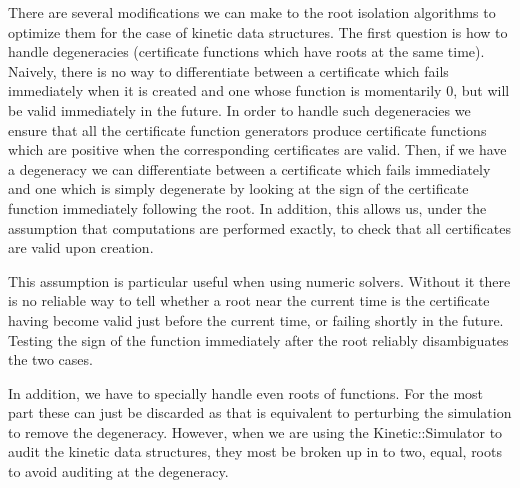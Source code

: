 There are several modifications we can make to the root isolation
algorithms to optimize them for the case of kinetic data structures.
The first question is how to handle degeneracies (certificate
functions which have roots at the same time).  Naively, there is no
way to differentiate between a certificate which fails immediately
when it is created and one whose function is momentarily 0, but will
be valid immediately in the future. In order to handle such
degeneracies we ensure that all the certificate function generators
produce certificate functions which are positive when the
corresponding certificates are valid.  Then, if we have a degeneracy
we can differentiate between a certificate which fails immediately and
one which is simply degenerate by looking at the sign of the
certificate function immediately following the root. In addition, this
allows us, under the assumption that computations are performed
exactly, to check that all certificates are valid upon creation.

This assumption is particular useful when using numeric solvers.
Without it there is no reliable way to tell whether a root near the
current time is the certificate having become valid just before the
current time, or failing shortly in the future. Testing the sign of
the function immediately after the root reliably disambiguates the two
cases.

In addition, we have to specially handle even roots of functions. For
the most part these can just be discarded as that is equivalent to
perturbing the simulation to remove the degeneracy. However, when we
are using the Kinetic::Simulator to audit the kinetic data structures,
they most be broken up in to two, equal, roots to avoid auditing at
the degeneracy.
